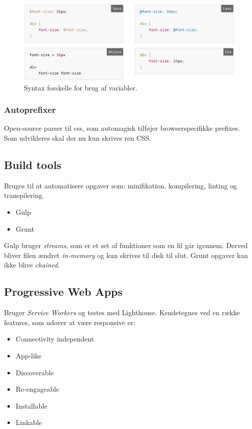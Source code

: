 \begin{figure}[H]
	\centering
	\includegraphics[width=\linewidth]{figs/spm3/css-prepro-variables}
	\caption{Syntax forskelle for brug af variabler.}
	\label{fig:css-prepro-variables}
\end{figure}

\subsubsection{Autoprefixer}
Open-source parser til css, som automagisk tilføjer browserspecifikke prefixes. Som udvikleres skal der nu kun skrives ren CSS. 

\subsection{Build tools}
Bruges til at automatisere opgaver som: minifikation, kompilering, linting og transpilering.

\begin{itemize}
	\item Gulp 
	\item Grunt
\end{itemize}

Gulp bruger \textit{streams}, som er et set af funktioner som en fil går igennem. Derved bliver filen ændret \textit{in-memory} og kun skrives til disk til slut. Grunt opgaver kan ikke blive \textit{chained}.

\subsection{Progressive Web Apps}
Bruger \textit{Service Workers} og testes med Lighthouse. Kendetegnes ved en række features, som udover at være responsive er:

\begin{multicols}{2}
\begin{itemize}
	\item Connectivity independent
	\item App-like
	\item Discoverable
	\item Re-engageable
	\item Installable
	\item Linkable
\end{itemize}
\end{multicols}

